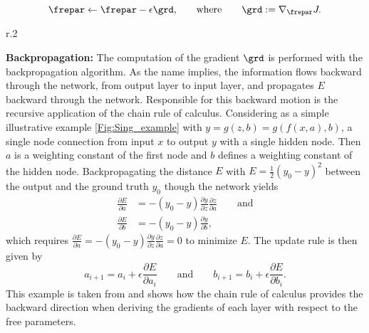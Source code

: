 \begin{equation}
	\frepar \leftarrow \frepar - \epsilon\grd\mathrm{,} \qquad\mathrm{where}\qquad \grd:= \nabla_{\frepar}J\mathrm{.}
	\label{Eq: update}
\end{equation}
\begin{wrapfigure}{r}{.2\textwidth}
	\centering
	\vspace{-10pt}
	
	\vspace{-5pt}
	\caption{\footnotesize A single node network with one hidden node between input and output node.}
	\label{Fig:Sing_example}
\end{wrapfigure}
\textbf{Backpropagation:} The computation of the gradient \(\grd\) is performed with the backpropagation algorithm. As the name implies, the information flows backward through the network, from output layer to input layer, and propagates \(E\) backward through the network. Responsible for this backward motion is the recursive application of the chain rule of calculus. Considering as a simple illustrative example \cref{Fig:Sing_example} with \(y=g(z,b)=g(f(x,a),b)\), a single node connection from input \(x\) to output \(y\) with a single hidden node. Then \(a\) is a weighting constant of the first node and \(b\) defines a weighting constant of the hidden node. Backpropagating the distance \(E\) with \(E = \frac{1}{2}(y_0 -y)^2\) between the output and the ground truth \(y_0\) though the network yields
\begin{align}
	\frac{\partial E}{\partial a} &= -(y_0 - y)\frac{\partial y}{\partial z}\frac{\partial z}{\partial a}\qquad \mathrm{and}\\
	\frac{\partial E}{\partial b} &= -(y_0 - y)\frac{\partial y}{\partial b}\mathrm{,}
\end{align}
which requires \(\frac{\partial E}{\partial a} = -(y_0 - y)\frac{\partial y}{\partial z}\frac{\partial z}{\partial a} = 0\) to minimize \(E\). The update rule is then given by
\begin{equation}
	a_{i+1} = a_i + \epsilon \frac{\partial E}{\partial a_i} \qquad\mathrm{and}\qquad
	b_{i+1} = b_i + \epsilon \frac{\partial E}{\partial b_i}\mathrm{.}
\end{equation}
This example is taken from \cite{Kutz} and shows how the chain rule of calculus provides the backward direction when deriving the gradients of each layer with respect to the free parameters.\\

